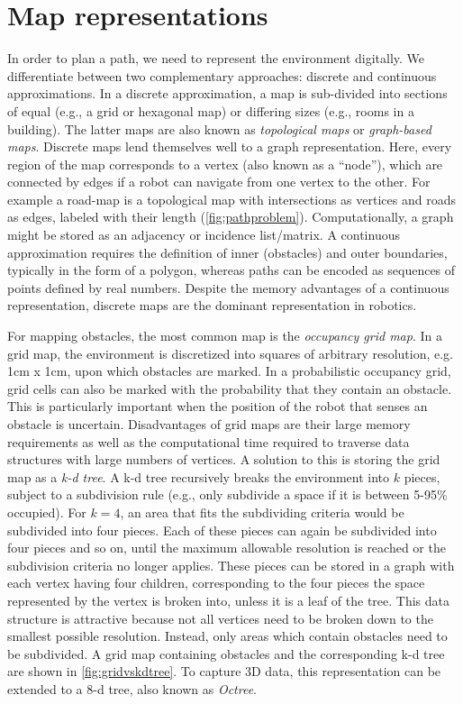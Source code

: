 \section{Map representations}\label{sec:maps}
In order to plan a path, we need to represent the environment digitally. We differentiate between two complementary approaches: discrete and continuous approximations. In a discrete approximation, a map is sub-divided into sections of equal (e.g., a grid or hexagonal map) or differing sizes (e.g., rooms in a building). The latter maps are also known as \textsl{topological maps} or \textsl{graph-based maps}. Discrete maps lend themselves well to a graph representation. Here, every region of the map corresponds to a vertex (also known as a ``node''), which are connected by edges if a robot can navigate from one vertex to the other. For example a road-map is a topological map with intersections as vertices and roads as edges, labeled with their length (\cref{fig:pathproblem}). Computationally, a graph might be stored as an adjacency or incidence list/matrix. A continuous approximation requires the definition of inner (obstacles) and outer boundaries, typically in the form of a polygon, whereas paths can be encoded as sequences of points defined by real numbers. Despite the memory advantages of a continuous representation, discrete maps are the dominant representation in robotics.

For mapping obstacles, the most common map is the \textsl{occupancy grid map}. In a grid map, the environment is discretized into squares of arbitrary resolution, e.g. 1cm x 1cm, upon which obstacles are marked. In a probabilistic occupancy grid, grid cells can also be marked with the probability that they contain an obstacle. This is particularly important when the position of the robot that senses an obstacle is uncertain. Disadvantages of grid maps are their large memory requirements as well as the computational time required to traverse data structures with large numbers of vertices. A solution to this is storing the grid map as a \textsl{k-d tree}. A k-d tree recursively breaks the environment into $k$ pieces, subject to a subdivision rule (e.g., only subdivide a space if it is between 5-95\% occupied). For $k=4$, an area that fits the subdividing criteria would be subdivided into four pieces. Each of these pieces can again be subdivided into four pieces and so on, until the maximum allowable resolution is reached or the subdivision criteria no longer applies. These pieces can be stored in a graph with each vertex having four children, corresponding to the four pieces the space represented by the vertex is broken into, unless it is a leaf of the tree. This data structure is attractive because not all vertices need to be broken down to the smallest possible resolution. Instead, only areas which contain obstacles need to be subdivided. A grid map containing obstacles and the corresponding k-d tree are shown in \cref{fig:gridvskdtree}. To capture 3D data, this representation can be extended to a 8-d tree, also known as \textsl{Octree}. 

